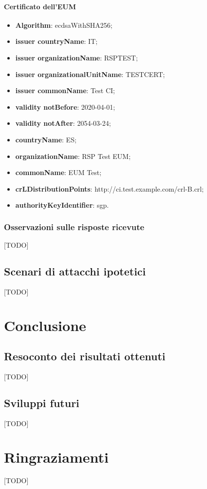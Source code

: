 \documentclass[10pt, oneside]{book}
\begin{document}
\subsubsection{Certificato dell'EUM}
\begin{itemize}
\item \textbf{Algorithm}: ecdsaWithSHA256;
\item \textbf{issuer countryName}: IT;
\item \textbf{issuer organizationName}: RSPTEST;
\item \textbf{issuer organizationalUnitName}: TESTCERT;
\item \textbf{issuer commonName}: Test CI;
\item \textbf{validity notBefore}: 2020-04-01;
\item \textbf{validity notAfter}: 2054-03-24;
\item \textbf{countryName}: ES;
\item \textbf{organizationName}: RSP Test EUM;
\item \textbf{commonName}: EUM Test;
\item \textbf{crLDistributionPoints}: http://ci.test.example.com/crl-B.crl;
\item \textbf{authorityKeyIdentifier}: sgp.
\end{itemize}

\subsection{Osservazioni sulle risposte ricevute}
[TODO]

\section{Scenari di attacchi ipotetici}
[TODO]

\chapter{Conclusione}
\section{Resoconto dei risultati ottenuti}
[TODO]

\section{Sviluppi futuri}
[TODO]



\chapter*{Ringraziamenti}
[TODO]
\end{document}
